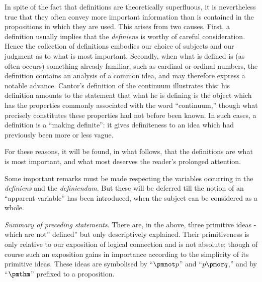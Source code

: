 \documentclass[letterpaper,12pt,openany,leqno]{book}
\begin{document}
In spite of the fact that definitions are theoretically superfluous, it is nevertheless true that they often convey more important information than is contained in the propositions in which they are used. This arises from two causes. First, a definition usually implies that the \textit{definiens} is worthy of careful consideration. Hence the collection of definitions embodies our choice of subjects and our judgment as to what is most important. Secondly, when what is defined is (as often occurs) something already familiar, such as cardinal or ordinal numbers, the definition contains an analysis of a common idea, and may therefore express a notable advance. Cantor's definition of the continuum illustrates this: his definition amounts to the statement that what he is defining is the object which has the properties commonly associated with the word ``continuum,'' though what precisely constitutes these properties had not before been known. In such cases, a definition is a ``making definite'': it gives definiteness to an idea which had previously been more or less vague.

For these reasons, it will be found, in what follows, that the definitions are what is most important, and what most deserves the reader's prolonged attention.

Some important remarks must be made respecting the variables occurring in the \textit{definiens} and the \textit{definiendum}. But these will be deferred till the notion of an ``apparent variable'' has been introduced, when the subject can be considered as a whole.

\textit{Summary of preceding statements}. There are, in the above, three primitive ideas -which are not'' defined'' but only descriptively explained. Their primitiveness is only relative to our exposition of logical connection and is not absolute; though of course such an exposition gains in importance according to the simplicity of its primitive ideas. These ideas are symbolised by ``$\pmnot p$'' and ``$p \pmor q$,'' and by ``$\pmthm$'' prefixed to a proposition.
\end{document}
